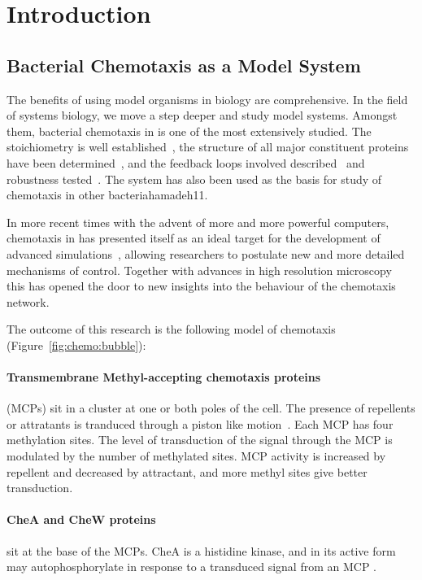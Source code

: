 \documentclass[../main.tex]{subfiles}
\begin{document}
\section{Introduction}

\subsection{Bacterial Chemotaxis as a Model System}
The benefits of using model organisms in biology are comprehensive. In the field of systems biology, we move a step deeper and study model systems. Amongst them, bacterial chemotaxis in \ecolilong is one of the most extensively studied. The stoichiometry is well established~\citep{li04}, the structure of all major constituent proteins have been determined~\citep{zhou02, milligan87, stock89}, and the feedback loops involved described~\citep{kentner09} and robustness tested~\citep{yi00}. The \ecoli system has also been used as the basis for study of chemotaxis in other bacteria{hamadeh11}.

In more recent times with the advent of more and more powerful computers, chemotaxis in \ecoli has presented itself as an ideal target for the development of advanced simulations~\citep{bray93, lipkow05, miller10}, allowing researchers to postulate new and more detailed mechanisms of control. Together with advances in high resolution microscopy~\citep{greenfield09} this has opened the door to new insights into the behaviour of the \ecoli chemotaxis network.

The outcome of this research is the following model of chemotaxis (Figure~\ref{fig:chemo:bubble}):

\paragraph{Transmembrane Methyl-accepting chemotaxis proteins} (MCPs) sit in a cluster at one or both poles of the cell. The presence of repellents or attratants is tranduced through a piston like motion~\citep{hall11}. Each MCP has four methylation sites. The level of transduction of the signal through the MCP is modulated by the number of methylated sites. MCP activity is increased by repellent and decreased by attractant, and more methyl sites give better transduction.

\paragraph{CheA and CheW proteins} sit at the base of the MCPs. CheA is a histidine kinase, and in its active form may autophosphorylate in response to a transduced signal from an MCP \citep{sourjik10}.
\end{document}
